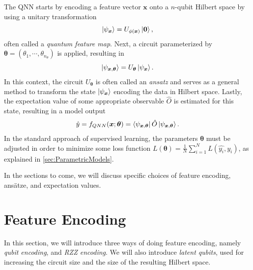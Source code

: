 The QNN starts by encoding a feature vector $\boldsymbol{x}$ onto a $n$-qubit Hilbert space by using a unitary transformation 
\begin{equation}
    \ket{\psi_{\boldsymbol{x}}} = U_{\phi(\boldsymbol{x})}\ket{\boldsymbol{0}},
\end{equation}
often called a \emph{quantum feature map}. Next, a circuit parameterized by $\boldsymbol{\theta} = (\theta_1, \cdots, \theta_{n_{\theta}})$ is applied, resulting in 
\begin{equation}
    \ket{\psi_{\boldsymbol{x}, \boldsymbol{\theta}}} = U_{\boldsymbol{\theta}}\ket{\psi_{\boldsymbol{x}}}.
\end{equation} In this context, the circuit $U_{\boldsymbol{\theta}}$ is often called an \emph{ansatz} and serves as a general method to transform the state $\ket{\psi_{\boldsymbol{x}}}$ encoding the data in Hilbert space. Lastly, the expectation value of some appropriate observable $\hat{O}$ is estimated for this state, resulting in a model output 
\begin{equation}\label{eq:QNN}
    \hat{y} = f_{QNN}(\boldsymbol{x};\boldsymbol{\theta}) = \bra{\psi_{\boldsymbol{x}, \boldsymbol{\theta}}} \hat{O} \ket{\psi_{\boldsymbol{x}, \boldsymbol{\theta}}}.
\end{equation} In the standard approach of supervised learning, the parameters $\boldsymbol{\theta}$ must be adjusted in order to minimize some loss function $L(\boldsymbol{\theta}) = \frac{1}{N}\sum_{i=1}^N L(\hat{y_i},y_i)$, as explained in \autoref{sec:ParametricModels}. 

In the sections to come, we will discuss specific choices of feature encoding, ansätze, and expectation values.

\section{Feature Encoding}\label{sec:FeatureEncoding}
In this section, we will introduce three ways of doing feature encoding, namely \emph{qubit encoding}, and \emph{RZZ encoding}. We will also introduce \emph{latent qubits}, used for increasing the circuit size and the size of the resulting Hilbert space. 

